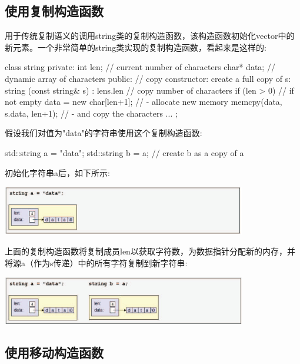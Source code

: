 \subsection{使用复制构造函数}

用于传统复制语义的调用string类的复制构造函数，该构造函数初始化vector中的新元素。一个非常简单的string类实现的复制构造函数，看起来是这样的:

\begin{cppcode}
class string {
	private:
	int len; // current number of characters
	char* data; // dynamic array of characters
	public:
	// copy constructor: create a full copy of s:
	string (const string& s)
	: len{s.len} { // copy number of characters
		if (len > 0) { // if not empty
			data = new char[len+1]; // - allocate new memory
			memcpy(data, s.data, len+1); // - and copy the characters
		}
	}
	...
};
\end{cppcode}

假设我们对值为"data"的字符串使用这个复制构造函数:

\begin{cppcode}
std::string a = "data";
std::string b = a; // create b as a copy of a
\end{cppcode}

初始化字符串a后，如下所示:

\begin{center}
	\includegraphics[width=0.8\textwidth]{part1/ch1/images/18}
\end{center}

上面的复制构造函数将复制成员len以获取字符数，为数据指针分配新的内存，并将源a（作为s传递）中的所有字符复制到新字符串:

\begin{center}
	\includegraphics[width=0.8\textwidth]{part1/ch1/images/19}
\end{center}

\subsection{使用移动构造函数}

